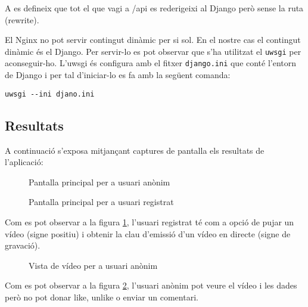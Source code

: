 \documentclass[12pt, titlepage]{article}
\begin{document}
A  es defineix que tot el que vagi a /api es rederigeixi al Django
però sense la ruta  (rewrite).

El Nginx no pot servir contingut dinàmic per si sol. En el nostre cas el contingut
dinàmic és el Django. Per servir-lo es pot observar que s'ha utilitzat el \verb|uwsgi|
per aconseguir-ho. L'uwsgi és configura amb el fitxer \verb|django.ini| que conté
l'entorn de Django i per tal d'iniciar-lo es fa amb la següent comanda:

\begin{lstlisting}
uwsgi --ini djano.ini
\end{lstlisting}

\subsection{Resultats}

A continuació s'exposa mitjançant captures de pantalla els resultats de l'aplicació:

\begin{figure}[H]
\begin{center}
\end{center}
\caption{Pantalla principal per a usuari anònim}
\end{figure}

\begin{figure}[H]
\begin{center}
\end{center}
\caption{Pantalla principal per a usuari registrat}
\label{frontRegisteredUser}
\end{figure}
Com es pot observar a la figura \ref{frontRegisteredUser}, l'usuari registrat té
com a opció de pujar un vídeo (signe positiu) i obtenir la clau d'emissió d'un
vídeo en directe (signe de gravació).




\begin{figure}[H]
\begin{center}
\end{center}
\caption{Vista de vídeo per a usuari anònim}
\label{videoViewAnonymous}
\end{figure}
Com es pot observar a la figura \ref{videoViewAnonymous}, l'usuari anònim pot
veure el vídeo i les dades però no pot donar like, unlike o enviar un comentari.
\end{document}
